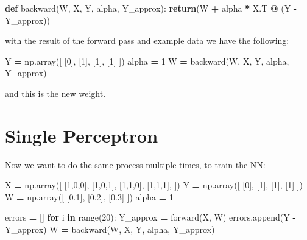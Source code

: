 \documentclass[
]{book}
\newenvironment{Shaded}{\begin{snugshade}}{\end{snugshade}}
\newcommand{\BuiltInTok}[1]{#1}
\newcommand{\ControlFlowTok}[1]{\textcolor[rgb]{0.13,0.29,0.53}{\textbf{#1}}}
\newcommand{\DecValTok}[1]{\textcolor[rgb]{0.00,0.00,0.81}{#1}}
\newcommand{\FloatTok}[1]{\textcolor[rgb]{0.00,0.00,0.81}{#1}}
\newcommand{\KeywordTok}[1]{\textcolor[rgb]{0.13,0.29,0.53}{\textbf{#1}}}
\newcommand{\NormalTok}[1]{#1}
\newcommand{\OperatorTok}[1]{\textcolor[rgb]{0.81,0.36,0.00}{\textbf{#1}}}
\begin{document}
\begin{Shaded}
\begin{Highlighting}[]
\KeywordTok{def}\NormalTok{ backward(W, X, Y, alpha, Y\_approx):}
    \ControlFlowTok{return}\NormalTok{(W }\OperatorTok{+}\NormalTok{ alpha }\OperatorTok{*}\NormalTok{ X.T }\OperatorTok{@}\NormalTok{ (Y }\OperatorTok{{-}}\NormalTok{ Y\_approx))}
\end{Highlighting}
\end{Shaded}

with the result of the forward pass and example data we have the following:

\begin{Shaded}
\begin{Highlighting}[]
\NormalTok{Y }\OperatorTok{=}\NormalTok{ np.array([}
\NormalTok{  [}\DecValTok{0}\NormalTok{],}
\NormalTok{  [}\DecValTok{1}\NormalTok{],}
\NormalTok{  [}\DecValTok{1}\NormalTok{],}
\NormalTok{  [}\DecValTok{1}\NormalTok{]}
\NormalTok{])}
\NormalTok{alpha }\OperatorTok{=} \DecValTok{1}
\NormalTok{W }\OperatorTok{=}\NormalTok{ backward(W, X, Y, alpha, Y\_approx)}
\end{Highlighting}
\end{Shaded}

and this is the new weight.

\hypertarget{single-perceptron}{%
\section{Single Perceptron}\label{single-perceptron}}

Now we want to do the same process multiple times, to train the NN:

\begin{Shaded}
\begin{Highlighting}[]
\NormalTok{X }\OperatorTok{=}\NormalTok{ np.array([}
\NormalTok{  [}\DecValTok{1}\NormalTok{,}\DecValTok{0}\NormalTok{,}\DecValTok{0}\NormalTok{],}
\NormalTok{  [}\DecValTok{1}\NormalTok{,}\DecValTok{0}\NormalTok{,}\DecValTok{1}\NormalTok{],}
\NormalTok{  [}\DecValTok{1}\NormalTok{,}\DecValTok{1}\NormalTok{,}\DecValTok{0}\NormalTok{],}
\NormalTok{  [}\DecValTok{1}\NormalTok{,}\DecValTok{1}\NormalTok{,}\DecValTok{1}\NormalTok{],}
\NormalTok{])}
\NormalTok{Y }\OperatorTok{=}\NormalTok{ np.array([}
\NormalTok{  [}\DecValTok{0}\NormalTok{],}
\NormalTok{  [}\DecValTok{1}\NormalTok{],}
\NormalTok{  [}\DecValTok{1}\NormalTok{],}
\NormalTok{  [}\DecValTok{1}\NormalTok{]}
\NormalTok{])}
\NormalTok{W }\OperatorTok{=}\NormalTok{ np.array([}
\NormalTok{  [}\FloatTok{0.1}\NormalTok{], }
\NormalTok{  [}\FloatTok{0.2}\NormalTok{], }
\NormalTok{  [}\FloatTok{0.3}\NormalTok{]}
\NormalTok{])}
\NormalTok{alpha }\OperatorTok{=} \DecValTok{1}

\NormalTok{errors }\OperatorTok{=}\NormalTok{ []}
\ControlFlowTok{for}\NormalTok{ i }\KeywordTok{in} \BuiltInTok{range}\NormalTok{(}\DecValTok{20}\NormalTok{):}
\NormalTok{  Y\_approx }\OperatorTok{=}\NormalTok{ forward(X, W)}
\NormalTok{  errors.append(Y }\OperatorTok{{-}}\NormalTok{ Y\_approx)}
\NormalTok{  W }\OperatorTok{=}\NormalTok{ backward(W, X, Y, alpha, Y\_approx)}
\end{Highlighting}
\end{Shaded}
\end{document}
